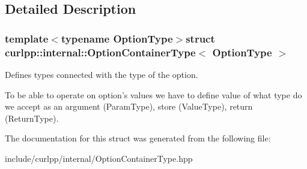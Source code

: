 \subsection{Detailed Description}
\subsubsection*{template$<$typename Option\-Type$>$struct curlpp\-::internal\-::\-Option\-Container\-Type$<$ Option\-Type $>$}

Defines types connected with the type of the option. 

To be able to operate on option's values we have to define value of what type do we accept as an argument (Param\-Type), store (Value\-Type), return (Return\-Type). 

The documentation for this struct was generated from the following file\-:\begin{DoxyCompactItemize}
\item 
include/curlpp/internal/Option\-Container\-Type.\-hpp\end{DoxyCompactItemize}
